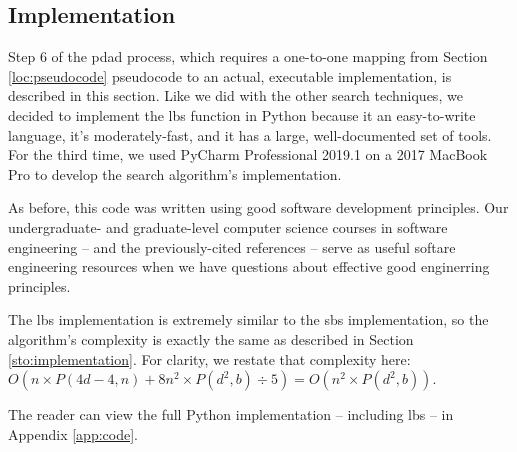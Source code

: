 \documentclass[../main.tex]{subfiles}
\begin{document}
\subsection{Implementation}\label{loc:implementation}

Step 6 of the \ac{pdad} process, which requires a one-to-one mapping from Section \ref{loc:pseudocode} pseudocode to an actual, executable implementation, is described in this section. Like we did with the other search techniques, we decided to implement the \ac{lbs} function in Python because it an easy-to-write language, it's moderately-fast, and it has a large, well-documented set of tools. For the third time, we used PyCharm Professional 2019.1 on a 2017 MacBook Pro to develop the search algorithm's implementation.

As before, this code was written using good software development principles. Our undergraduate- and graduate-level computer science courses in software engineering -- and the previously-cited references \cite{Sommerville2010, Gamma1994, Gomaa2011} -- serve as useful softare engineering resources when we have questions about effective good enginerring principles.

The \ac{lbs} implementation is extremely similar to the \ac{sbs} implementation, so the algorithm's complexity is exactly the same as described in Section \ref{sto:implementation}. For clarity, we restate that complexity here: $O(n\times P(4d-4,n)+8n^2\times P(d^2,b)\div 5)=O(n^2\times P(d^2,b))$.

The reader can view the full Python \probs implementation -- including \acl{lbs} -- in Appendix \ref{app:code}.
\end{document}
